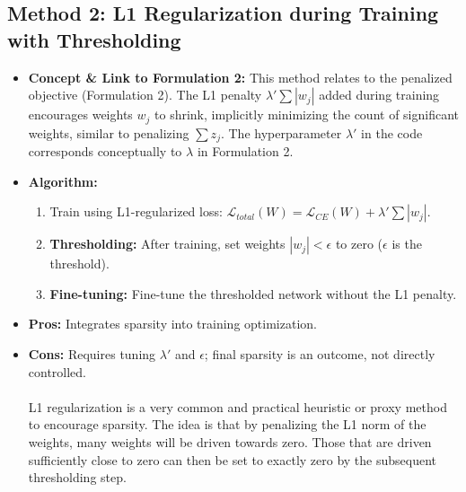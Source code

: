 \documentclass[conference]{IEEEtran} %
\begin{document}
\subsection{Method 2: L1 Regularization during Training with Thresholding}
\begin{itemize}
    \item \textbf{Concept \& Link to Formulation 2:} This method relates to the penalized objective (Formulation 2). The L1 penalty $\lambda' \sum |w_j|$ added during training encourages weights $w_j$ to shrink, implicitly minimizing the count of significant weights, similar to penalizing $\sum z_j$. The hyperparameter $\lambda'$ in the code corresponds conceptually to $\lambda$ in Formulation 2.
    \item \textbf{Algorithm:}
    \begin{enumerate} %
        \item Train using L1-regularized loss: $\mathcal{L}_{total}(W) = \mathcal{L}_{CE}(W) + \lambda' \sum |w_j|$.
        \item \textbf{Thresholding:} After training, set weights $|w_j| < \epsilon$ to zero ($\epsilon$ is the threshold).
        \item \textbf{Fine-tuning:} Fine-tune the thresholded network without the L1 penalty.
    \end{enumerate} %
    \item \textbf{Pros:} Integrates sparsity into training optimization.
    \item \textbf{Cons:} Requires tuning $\lambda'$ and $\epsilon$; final sparsity is an outcome, not directly controlled.
    \\
    \\
    L1 regularization is a very common and practical heuristic or proxy method to encourage sparsity. The idea is that by penalizing the L1 norm of the weights, many weights will be driven towards zero. Those that are driven sufficiently close to zero can then be set to exactly zero by the subsequent thresholding step.
\end{itemize}
\end{document}
